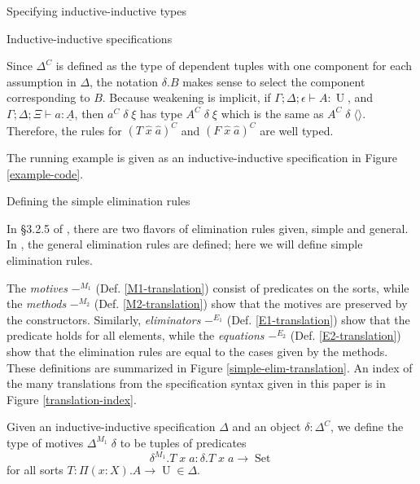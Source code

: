 \documentclass[runningheads]{llncs}
\DeclareMathOperator{\USet}{Set}
\DeclareMathOperator{\UU}{U}
\newcommand{\tac}{\vdash}
\def\emptytuple{\langle\rangle}
\begin{document}
{\begin{section}{Specifying inductive-inductive types}
\begin{subsection}{Inductive-inductive specifications}
\begin{definition}
Since $\Delta^C$ is defined as the type of dependent tuples with one component for each assumption in $\Delta$, the notation $\delta.B$ makes sense to select the component corresponding to $B$.
Because weakening is implicit, if $\Gamma ; \Delta ; \epsilon \tac A : \UU$, and $\Gamma ; \Delta ; \Xi \tac a : \underline{A}$, then $a^C\;\delta\;\xi$ has type $A^C\;\delta\;\xi$ which is the same as $A^C\;\delta\;\emptytuple$. Therefore, the rules for $(T\;\hat{x}\;\hat{a})^C$ and $(F\;\hat{x}\;\hat{a})^C$ are well typed. %

The running example is given as an inductive-inductive specification in Figure \ref{example-code}.

\end{definition}

\end{subsection}
\begin{subsection}{\label{simple-elim-section}Defining the simple elimination rules}
    
In \S3.2.5 of \citet{nordvallforsberg2013thesis}, there are two flavors of elimination rules given, simple and general. In \citet{KaposiKovacsHIITsyntax}, the general elimination rules are defined; here we will define simple elimination rules.

The \emph{motives} $-^{M_1}$ (Def. \ref{M1-translation}) consist of predicates on the sorts, while the \emph{methods} $-^{M_2}$ (Def. \ref{M2-translation}) show that the motives are preserved by the constructors. Similarly, \emph{eliminators} $-^{E_1}$ (Def. \ref{E1-translation}) show that the predicate holds for all elements, while the \emph{equations} $-^{E_2}$ (Def. \ref{E2-translation}) show that the elimination rules are equal to the cases given by the methods. These definitions are summarized in Figure \ref{simple-elim-translation}. An index of the many translations from the specification syntax given in this paper is in Figure \ref{translation-index}.

\begin{definition}
Given an inductive-inductive specification $\Delta$ and an object $\delta : \Delta^C$, we define the type of motives $\Delta^{M_1}\;\delta$ to be tuples of predicates \[\delta^{M_1}.T\;x\;a : \delta.T\;x\;a \to \USet\] for all sorts $T : \Pi(x : X).A \to \UU \in \Delta$.
\end{definition}


\end{subsection}
\end{section}}
\end{document}
